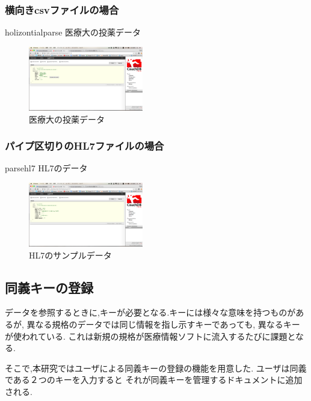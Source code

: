 		\subsubsection{横向きcsvファイルの場合}
			holizontialparse
			医療大の投薬データ
			\\
			\begin{figure}[htbp]
					\includegraphics[width=5cm, bb=0 0 437 688]{./gazou/touyaku.png}
				\caption{医療大の投薬データ}
				\label{ss-mix_sampledata}
			\end{figure}

		\subsubsection{パイプ区切りのHL7ファイルの場合}
			parsehl7
			HL7のデータ
			\\
			\begin{figure}[htbp]
					\includegraphics[width=5cm, bb=0 0 437 688]{./gazou/hl7.png}
				\caption{HL7のサンプルデータ}
				\label{ss-mix_sampledata}
			\end{figure}



\subsection{同義キーの登録}
	データを参照するときに,キーが必要となる.キーには様々な意味を持つものがあるが,
	異なる規格のデータでは同じ情報を指し示すキーであっても,
	異なるキーが使われている.
	これは新規の規格が医療情報ソフトに流入するたびに課題となる.

	そこで,本研究ではユーザによる同義キーの登録の機能を用意した.
	ユーザは同義である２つのキーを入力すると
	それが同義キーを管理するドキュメントに追加される.

